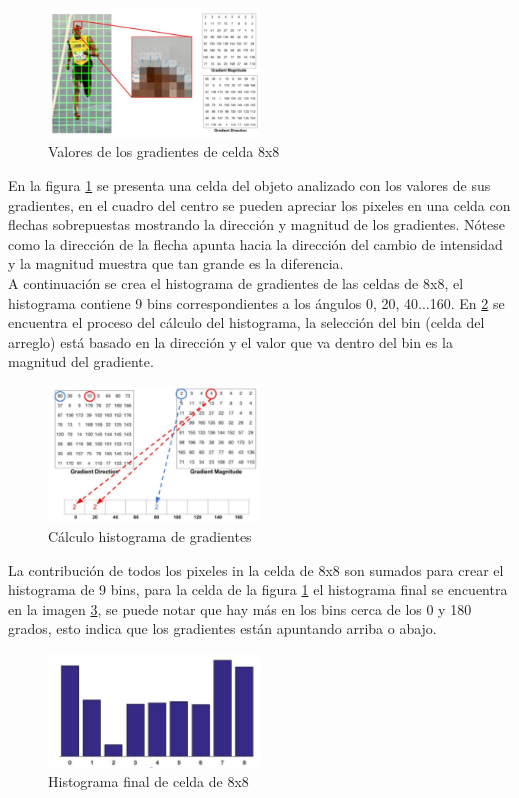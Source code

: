      \begin{figure}[htbp]
     	\centering
     	\includegraphics[width=0.5\textwidth]{./pictures/hog8x8}
     	\caption{Valores de los gradientes de celda 8x8}\label{fig: hog8x8}
     \end{figure}
     En la figura \ref{fig: hog8x8} se presenta una celda del objeto analizado con los valores de sus gradientes, en el cuadro del centro se pueden apreciar los pixeles en una celda con flechas sobrepuestas mostrando la dirección y magnitud de los gradientes. Nótese como la dirección de la flecha apunta hacia la dirección del cambio de intensidad y la magnitud muestra que tan grande es la diferencia.\\
     A continuación se crea el histograma de gradientes de las celdas de 8x8, el histograma contiene 9 bins correspondientes a los ángulos 0, 20, 40...160. En \ref{fig: hogCalc} se encuentra el proceso del cálculo del histograma, la selección del bin (celda del arreglo) está basado en la dirección y el valor que va dentro del bin es la magnitud del gradiente.
     
\begin{figure}[htbp]
   	\centering
   	\includegraphics[width=0.5\textwidth]{./pictures/hogHist}
   	\caption{Cálculo histograma de gradientes}\label{fig: hogCalc}
\end{figure}
     La contribución de todos los pixeles in la celda de 8x8 son sumados para crear el histograma de 9 bins, para la celda de la figura \ref{fig: hog8x8} el histograma final se encuentra en la imagen \ref{fig: finalHist}, se puede notar que hay más en los bins cerca de los 0 y 180 grados, esto indica que los gradientes están apuntando arriba o abajo.
 \begin{figure}[htbp]
 	\centering
 	\includegraphics[width=0.5\textwidth]{./pictures/finalHist}
 	\caption{Histograma final de celda de 8x8}\label{fig: finalHist}
 \end{figure}    
     
